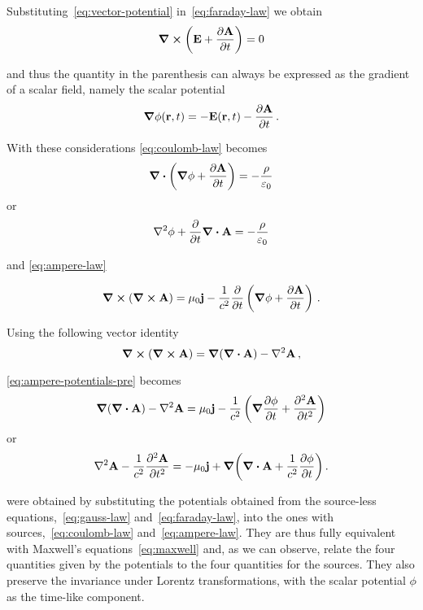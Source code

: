 \documentclass[12pt, class=report, crop=false]{standalone}
\begin{document}
Substituting~\eqref{eq:vector-potential} in~\eqref{eq:faraday-law} we obtain
\begin{equation}
  \label{eq:faraday-vector-potential}
  \curl(\vb{E} + \pdv{\vb{A}}{t}) = 0
\end{equation}

and thus the quantity in the parenthesis can always be expressed as the
gradient of a scalar field, namely the scalar potential
\[
\grad{\phi}(\vb{r}, t) = -\vb{E}(\vb{r}, t) - \pdv{\vb{A}}{t}\,.
\]

With these considerations \cref{eq:coulomb-law} becomes
\[
  \div(\grad{\phi} + \pdv{\vb{A}}{t}) = - \frac{\rho}{\varepsilon_0}
\]
or
\begin{equation}
  \label{eq:coulomb-scalar-potential}
  \laplacian{\phi} + \pdv{t}\div{\vb{A}} = - \frac{\rho}{\varepsilon_0}
\end{equation}

and \cref{eq:ampere-law}

\begin{equation}
  \label{eq:ampere-potentials-pre}
  \curl(\curl{\vb{A}}) = \mu_0 \vb{j}
    - \frac{1}{c^2} \pdv{t} \left( \grad{\phi} + \pdv{\vb{A}}{t} \right)\,.
\end{equation}

Using the following vector identity
\begin{equation}
  \label{eq:curl-of-curl}
  \curl(\curl{\vb{A}}) = \grad(\div{\vb{A}}) - \laplacian{\vb{A}}\,,
\end{equation}

\cref{eq:ampere-potentials-pre} becomes
\[
  \grad(\div{\vb{A}}) - \laplacian{\vb{A}} = \mu_0 \vb{j}
    - \frac{1}{c^2} \left( \grad{\pdv{\phi}{t}} + \pdv[2]{\vb{A}}{t} \right)
\]
or
\begin{equation}
  \label{eq:ampere-potentials}
  \laplacian{\vb{A}} - \frac{1}{c^2}\pdv[2]{\vb{A}}{t} =
    -\mu_0 \vb{j} + \grad(\div{\vb{A}} + \frac{1}{c^2} \pdv{\phi}{t})\,.
\end{equation}

were obtained by substituting the potentials obtained from the source-less
equations,~\eqref{eq:gauss-law} and~\eqref{eq:faraday-law}, into the ones
with sources,~\eqref{eq:coulomb-law} and~\eqref{eq:ampere-law}. They are thus
fully equivalent with Maxwell's equations~\eqref{eq:maxwell} and, as we can observe,
relate the four quantities given by the potentials to the four quantities for the
sources. They also preserve the invariance under Lorentz transformations, with
the scalar potential \(\phi\) as the time-like component.
\end{document}
